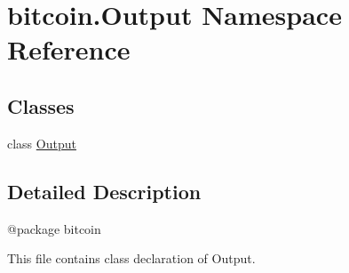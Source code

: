 \hypertarget{namespacebitcoin_1_1Output}{}\section{bitcoin.\+Output Namespace Reference}
\label{namespacebitcoin_1_1Output}
\subsection*{Classes}
\begin{DoxyCompactItemize}
\item 
class \hyperlink{classbitcoin_1_1Output_1_1Output}{Output}
\end{DoxyCompactItemize}


\subsection{Detailed Description}
\begin{DoxyVerb}@package bitcoin

This file contains class declaration of Output.
\end{DoxyVerb}
 